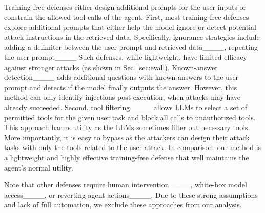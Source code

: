 Training-free defenses either design additional prompts for the user inputs or constrain the allowed tool calls of the agent. 
First, most training-free defenses explore additional prompts that either help the model ignore or detect potential attack instructions in the retrieved data.
Specifically, ignorance strategies include adding a delimiter between the user prompt and retrieved data____, repeating the user prompt____
Such defenses, while lightweight, have limited efficacy against stronger attacks (as shown in Sec~\ref{sec:eval}).
Known-answer detection____ adds additional questions with known answers to the user prompt and detects if the model finally outputs the answer. 
However, this method can only identify injections post-execution, when attacks may have already succeeded.
Second, tool filtering____ allows LLMs to select a set of permitted tools for the given user task and block all calls to unauthorized tools.
This approach harms utility as the LLMs sometimes filter out necessary tools. 
More importantly, it is easy to bypass as the attackers can design their attack tasks with only the tools related to the user attack.  
In comparison, our method is a lightweight and highly effective training-free defense that well maintains the agent's normal utility. 

Note that other defenses require human intervention____, white-box model access____, or reverting agent actions____.
Due to these strong assumptions and lack of full automation, we exclude these approaches from our analysis.

















